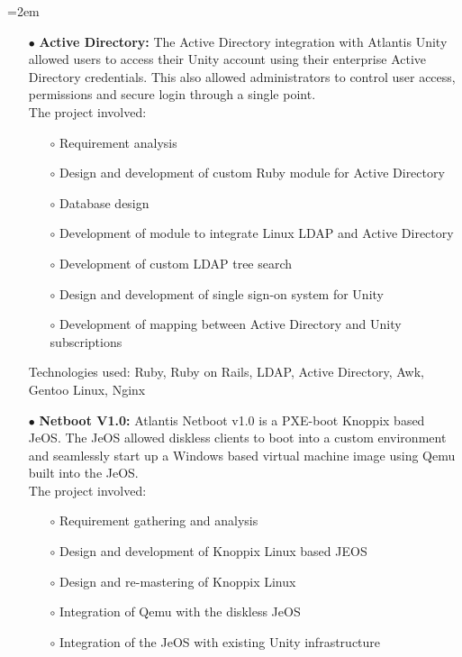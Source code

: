\documentclass{scrartcl}
\newcommand{\MarginDate}[1]{\marginpar{\raggedleft\itshape\small#1}}
\newcommand{\Description}[1]{\hangindent=2em\hangafter=0\noindent\raggedright\footnotesize{#1}\par\normalsize}
\begin{document}
\begin{cv}{
\href{http://www.develmj.com}{}
}
\Description{
\begin{itemize}
\item[\footnotesize$\bullet$] \textbf{Active Directory:}\MarginDate{Atlantis Unity} The Active Directory integration with Atlantis
  Unity allowed users to access their Unity account using their enterprise Active
  Directory credentials. This also allowed administrators to control user access,
  permissions and secure login through a single point.\\
  The project involved:
  {\scriptsize
  \begin{itemize}
  \item[\footnotesize$\circ$] Requirement analysis
  \item[\footnotesize$\circ$] Design and development of custom Ruby module for Active Directory
  \item[\footnotesize$\circ$] Database design
  \item[\footnotesize$\circ$] Development of module to integrate Linux LDAP and Active Directory
  \item[\footnotesize$\circ$] Development of custom LDAP tree search
  \item[\footnotesize$\circ$] Design and development of single sign-on system for Unity
  \item[\footnotesize$\circ$] Development of mapping between Active Directory and Unity
    subscriptions
  \end{itemize}}
  Technologies used: Ruby, Ruby on Rails, LDAP, Active Directory, Awk,
  Gentoo Linux, Nginx
\item[\footnotesize$\bullet$] \textbf{Netboot V1.0:} Atlantis Netboot v1.0 is a PXE-boot Knoppix based JeOS. The
JeOS allowed diskless clients to boot into a custom environment and
seamlessly start up a Windows based virtual machine image using Qemu
built into the JeOS.\\
The project involved:
{\scriptsize
  \begin{itemize}
  \item[\footnotesize$\circ$] Requirement gathering and analysis
  \item[\footnotesize$\circ$] Design and development of Knoppix Linux based JEOS
  \item[\footnotesize$\circ$] Design and re-mastering of Knoppix Linux
  \item[\footnotesize$\circ$] Integration of Qemu with the diskless JeOS
  \item[\footnotesize$\circ$] Integration of the JeOS with existing Unity infrastructure

\end{itemize}}
\end{itemize}}
\end{cv}
\end{document}
